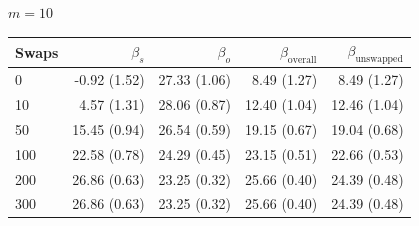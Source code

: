 \begin{table}[H]
\begin{tabular}{l rrrr}
\bottomrule
\end{tabular}
\par\medskip
\noindent\textit{$m = 10$}\\[2pt]
\begin{tabular}{l rrrr}
\toprule
Swaps & $\beta_s$ & $\beta_o$ & $\beta_{\mathrm{overall}}$ & $\beta_{\mathrm{unswapped}}$ \\
\midrule
0 & -0.92 (1.52) & 27.33 (1.06) & 8.49 (1.27) & 8.49 (1.27) \\
10 & 4.57 (1.31) & 28.06 (0.87) & 12.40 (1.04) & 12.46 (1.04) \\
50 & 15.45 (0.94) & 26.54 (0.59) & 19.15 (0.67) & 19.04 (0.68) \\
100 & 22.58 (0.78) & 24.29 (0.45) & 23.15 (0.51) & 22.66 (0.53) \\
200 & 26.86 (0.63) & 23.25 (0.32) & 25.66 (0.40) & 24.39 (0.48) \\
300 & 26.86 (0.63) & 23.25 (0.32) & 25.66 (0.40) & 24.39 (0.48) \\
\bottomrule
\end{tabular}
\end{table}

